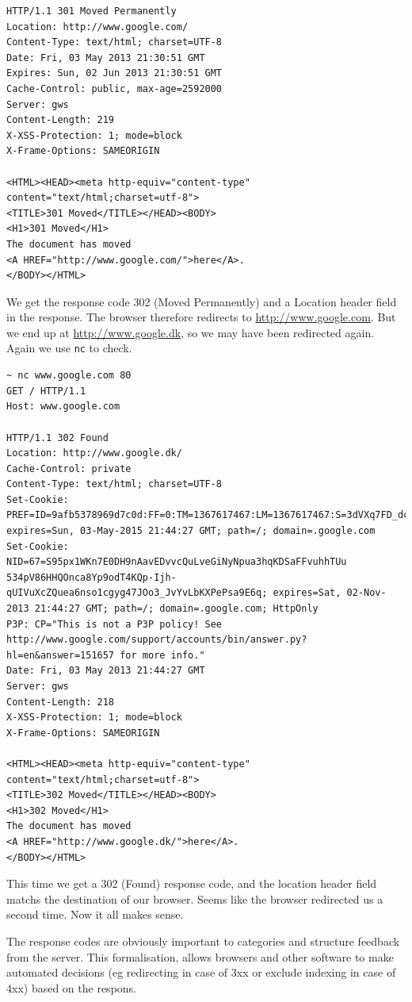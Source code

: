 \documentclass[a4paper]{article}
\begin{document}
\begin{description}
\begin{lstlisting}
HTTP/1.1 301 Moved Permanently
Location: http://www.google.com/
Content-Type: text/html; charset=UTF-8
Date: Fri, 03 May 2013 21:30:51 GMT
Expires: Sun, 02 Jun 2013 21:30:51 GMT
Cache-Control: public, max-age=2592000
Server: gws
Content-Length: 219
X-XSS-Protection: 1; mode=block
X-Frame-Options: SAMEORIGIN

<HTML><HEAD><meta http-equiv="content-type" content="text/html;charset=utf-8">
<TITLE>301 Moved</TITLE></HEAD><BODY>
<H1>301 Moved</H1>
The document has moved
<A HREF="http://www.google.com/">here</A>.
</BODY></HTML>
\end{lstlisting}
We get the response code 302 (Moved Permanently) and a Location header field in
the response. The browser therefore redirects to \url{http://www.google.com}.
But we end up at \url{http://www.google.dk}, so we may have been redirected
again. Again we use \texttt{nc} to check.

\begin{lstlisting}
~ nc www.google.com 80                                                                    
GET / HTTP/1.1
Host: www.google.com

HTTP/1.1 302 Found
Location: http://www.google.dk/
Cache-Control: private
Content-Type: text/html; charset=UTF-8
Set-Cookie: PREF=ID=9afb5378969d7c0d:FF=0:TM=1367617467:LM=1367617467:S=3dVXq7FD_dcXVzbV; expires=Sun, 03-May-2015 21:44:27 GMT; path=/; domain=.google.com
Set-Cookie: NID=67=S95px1WKn7E0DH9nAavEDvvcQuLveGiNyNpua3hqKDSaFFvuhhTUu 534pV86HHQOnca8Yp9odT4KQp-Ijh-qUIVuXcZQuea6nso1cgyg47JOo3_JvYvLbKXPePsa9E6q; expires=Sat, 02-Nov-2013 21:44:27 GMT; path=/; domain=.google.com; HttpOnly
P3P: CP="This is not a P3P policy! See http://www.google.com/support/accounts/bin/answer.py?hl=en&answer=151657 for more info."
Date: Fri, 03 May 2013 21:44:27 GMT
Server: gws
Content-Length: 218
X-XSS-Protection: 1; mode=block
X-Frame-Options: SAMEORIGIN

<HTML><HEAD><meta http-equiv="content-type" content="text/html;charset=utf-8">
<TITLE>302 Moved</TITLE></HEAD><BODY>
<H1>302 Moved</H1>
The document has moved
<A HREF="http://www.google.dk/">here</A>.
</BODY></HTML>
\end{lstlisting}
This time we get a 302 (Found) response code, and the location header field
matchs the destination of our browser. Seems like the browser redirected us a
second time. Now it all makes sense.

The response codes are obviously important to categories and  structure
feedback from the server. This formalisation, allows browsers and other
software to make automated decisions (eg redirecting in case of 3xx or exclude
indexing in case of 4xx) based on the respons.
\end{description}
\end{document}
